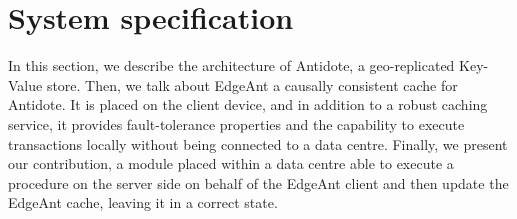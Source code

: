 \documentclass[11pt]{article}
\begin{document}
%
%
%
%
%
%
%



\section{System specification}

In this section, we describe the architecture of Antidote, a geo-replicated
Key-Value store. Then, we talk about EdgeAnt a causally consistent cache for
Antidote. It is placed on the client device, and in addition to a robust
caching service, it provides fault-tolerance properties and the capability to
execute transactions locally without being connected to a data centre.
Finally, we present our contribution, a module placed within a data centre
able to execute a procedure on the server side on behalf of the EdgeAnt client
and then update the EdgeAnt cache, leaving it in a correct state.
\end{document}
